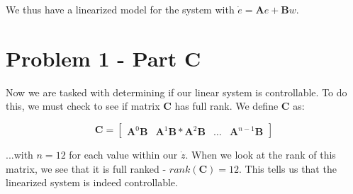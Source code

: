 \documentclass{article}
\begin{document}
We thus have a linearized model for the system with $\dot{e} = \boldsymbol{A}e + \boldsymbol{B}w$.

\section*{Problem 1 - Part C}

Now we are tasked with determining if our linear system is controllable. To do this, we must check to see if matrix $\boldsymbol{C}$ has full rank. We define $\boldsymbol{C}$ as:

\begin{equation}
    \boldsymbol{C} = \begin{bmatrix}
        \boldsymbol{A}^0\boldsymbol{B} & \boldsymbol{A}^1\boldsymbol{B} * \boldsymbol{A}^2\boldsymbol{B} & \ldots & \boldsymbol{A}^{n-1}\boldsymbol{B}
    \end{bmatrix}
\end{equation}

...with $n=12$ for each value within our $\dot{z}$. When we look at the rank of this matrix, we see that it is full ranked - $rank(\boldsymbol{C}) = 12$. This tells us that the linearized system is indeed controllable.
\end{document}
